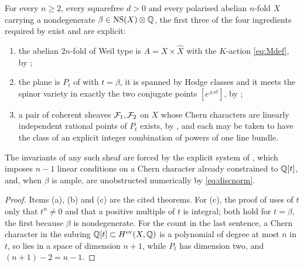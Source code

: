 \begin{theorem}\label{thm:twoofthefour}
For every $n\ge2$, every squarefree $d>0$ and every polarised abelian $n$-fold
$X$ carrying a nondegenerate $\beta\in\mathrm{NS}(X)\otimes\mathbb{Q}$, the first three of the
four ingredients required by  exist and are explicit:
\begin{enumerate}[label=\textup{(\alph*)}]
\item the abelian $2n$-fold of Weil type is $A=X\times\widehat{X}$ with the
  $K$-action \eqref{eq:Mdef}, by ;
\item the plane is $P_{t}$ of  with $t=\beta$, it is
  spanned by Hodge classes and it meets the spinor variety in exactly the two
  conjugate points $[e^{\pm st}]$, by ;
\item a pair of coherent sheaves $\mathcal{F}_{1},\mathcal{F}_{2}$ on $X$ whose Chern
  characters are linearly independent rational points of $P_{t}$ exists, by
  , and each may be taken to have the class of an
  explicit integer combination of powers of one line bundle.
\end{enumerate}
The invariants of any such sheaf are forced by the explicit system of
, which imposes $n-1$ linear conditions on a Chern
character already constrained to $\mathbb{Q}[t]$, and, when $\beta$ is ample, are
unobstructed numerically by \eqref{eq:discnorm}.
\end{theorem}

\begin{proof}
Items (a), (b) and (c) are the cited theorems. For (c), the proof of
 uses of $t$ only that $t^{n}\ne0$ and that a positive
multiple of $t$ is integral; both hold for $t=\beta$, the first because
$\beta$ is nondegenerate. For the count in the last sentence, a Chern
character in the subring $\mathbb{Q}[t]\subset H^{\mathrm{ev}}(X,\mathbb{Q})$ is a
polynomial of degree at most $n$ in $t$, so lies in a space of dimension
$n+1$, while $P_{t}$ has dimension two, and $(n+1)-2=n-1$.
\end{proof}

